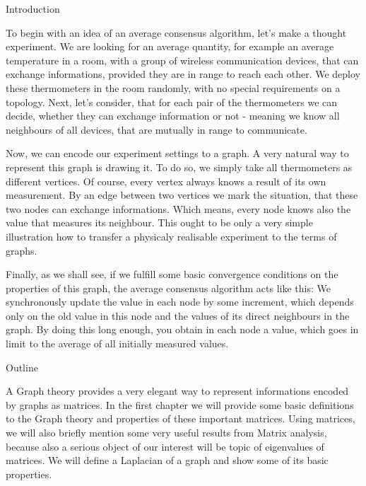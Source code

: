 
\def\ctustyle{{\tenss CTUstyle}}
\def\ttb{\tt\char`\\} %

\chap Introduction


To begin with an idea of an average consensus algorithm, let's make a thought experiment. We are looking for an average quantity, for example an average temperature in a room, with a group of wireless communication devices, that can exchange informations, provided they are in range to reach each other. We deploy these thermometers in the room randomly, with no special requirements on a topology. Next, let's consider, that for each pair of the thermometers we can decide, whether they can exchange information or not - meaning we know all neighbours of all devices, that are mutually in range to communicate. 

Now, we can encode our experiment settings to a graph. A very natural way to represent this graph is drawing it. To do so, we simply take all thermometers as different vertices. Of course, every vertex always knows a result of its own measurement. By an edge between two vertices we mark the situation, that these two nodes can exchange informations. Which means, every node knows also the value that measures its neighbour. This ought to be only a very simple illustration how to transfer a physicaly realisable experiment  to the terms of graphs.

 Finally, as we shall see, if we fulfill some basic convergence conditions on the properties of this graph, the average consensus algorithm acts like this: We synchronously update the value in each node by some increment, which depends only on the old value in this node and the values of its direct neighbours in the graph. By doing this long enough, you obtain in each node a value, which goes in limit to the average of  all initially measured values.

\sec Outline


 A Graph theory provides a very elegant way to represent informations encoded by graphs as matrices. In the first chapter we will provide some basic definitions to the Graph theory and properties of these important matrices. Using matrices, we will also briefly mention some very useful results from Matrix analysis, because also a serious object of our interest will be topic of eigenvalues of matrices. We will define a Laplacian of a graph and show some of its basic properties.

